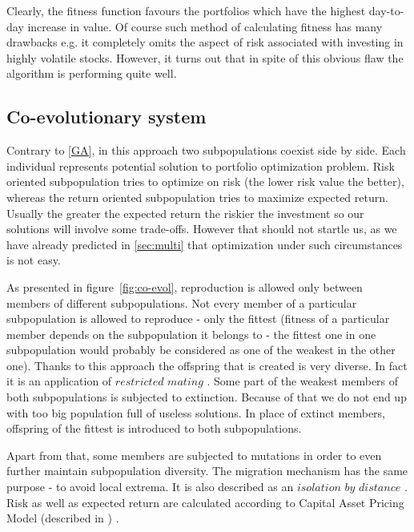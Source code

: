 Clearly, the fitness function favours the portfolios which have the highest day-to-day increase in value.
Of course such method of calculating fitness has many drawbacks e.g. it completely omits the aspect of risk associated with investing in highly volatile stocks.
However, it turns out that in spite of this obvious flaw the algorithm is performing quite well.  

\subsection{Co-evolutionary system}
\label{sec:co-evol-sys}

Contrary to \ref{GA}, in this approach two subpopulations coexist side by side.
Each individual represents potential solution to portfolio optimization problem.
Risk oriented subpopulation tries to optimize on risk (the lower risk value the better), whereas the return oriented subpopulation tries to maximize expected return.
Usually the greater the expected return the riskier the investment so our solutions will involve some trade-offs.
However that should not startle us, as we have already predicted in \ref{sec:multi} that optimization under such circumstances is not easy.

As presented in figure~\ref{fig:co-evol}, reproduction is allowed only between members of different subpopulations.
Not every member of a particular subpopulation is allowed to reproduce - only the fittest (fitness of a particular member depends on the subpopulation it belongs to - the fittest one
 in one subpopulation would probably be considered as one of the weakest in the other one).
Thanks to this approach the offspring that is created is very diverse.
In fact it is an application of $restricted$ $mating$ \cite{zitz1999a}.
Some part of the weakest members of both subpopulations is subjected to extinction.
Because of that we do not end up with too big population full of useless solutions.
In place of extinct members, offspring of the fittest is introduced to both subpopulations.

Apart from that, some members are subjected to mutations in order to even further maintain subpopulation diversity.
The migration mechanism has the same purpose - to avoid local extrema.
It is also described as an $isolation$ $by$ $distance$ \cite{zitz1999a}.
Risk as well as expected return are calculated according to Capital Asset Pricing Model (described in \cite{CAPM}) .
 

